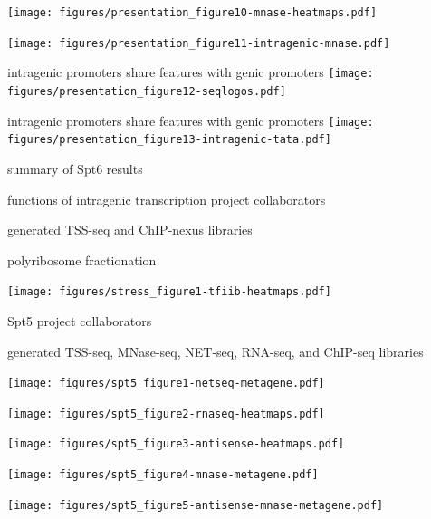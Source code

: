 \documentclass[aspectratio=169]{beamer}
\begin{document}
\begin{frame}
\texttt{[image: figures/presentation\_figure10-mnase-heatmaps.pdf]}
\end{frame}

\begin{frame}
\texttt{[image: figures/presentation\_figure11-intragenic-mnase.pdf]}
\end{frame}

\begin{frame}{intragenic promoters share features with genic promoters}
    \texttt{[image: figures/presentation\_figure12-seqlogos.pdf]}
\end{frame}

\begin{frame}{intragenic promoters share features with genic promoters}
    \texttt{[image: figures/presentation\_figure13-intragenic-tata.pdf]}
\end{frame}

\begin{frame}{summary of Spt6 results}
\end{frame}

\begin{frame}{functions of intragenic transcription project collaborators}
    \begin{description}[align=right, noitemsep]
        \item [Steve Doris] generated TSS-seq and ChIP-nexus libraries
        \item [Dan Spatt] polyribosome fractionation
    \end{description}
\end{frame}

\begin{frame}
\texttt{[image: figures/stress\_figure1-tfiib-heatmaps.pdf]}
\end{frame}

\begin{frame}{Spt5 project collaborators}
    \begin{description}[align=right, noitemsep]
        \item [Ameet Shetty] generated TSS-seq, MNase-seq, NET-seq, RNA-seq, and ChIP-seq libraries
    \end{description}
\end{frame}

\begin{frame}
\texttt{[image: figures/spt5\_figure1-netseq-metagene.pdf]}
\end{frame}

\begin{frame}
\texttt{[image: figures/spt5\_figure2-rnaseq-heatmaps.pdf]}
\end{frame}

\begin{frame}
\texttt{[image: figures/spt5\_figure3-antisense-heatmaps.pdf]}
\end{frame}

\begin{frame}
\texttt{[image: figures/spt5\_figure4-mnase-metagene.pdf]}
\end{frame}

\begin{frame}
\texttt{[image: figures/spt5\_figure5-antisense-mnase-metagene.pdf]}
\end{frame}
\end{document}
